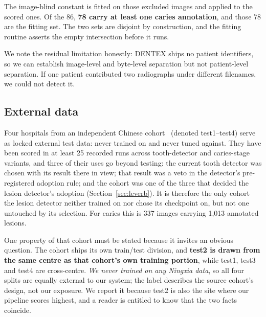 \documentclass[conference]{IEEEtran}
\begin{document}
The image-blind constant is fitted on those excluded images and applied to the
scored ones. Of the 86, \textbf{78 carry at least one caries annotation}, and
those 78 are the fitting set. The two sets are disjoint by construction, and the
fitting routine asserts the empty intersection before it runs.

We note the residual limitation honestly: DENTEX ships no patient identifiers,
so we can establish image-level and byte-level separation but not patient-level
separation. If one patient contributed two radiographs under different
filenames, we could not detect it.

\subsection{External data}
Four hospitals from an independent Chinese cohort~\cite{li2024multicenter} (denoted
test1--test4) serve as locked external test data: never trained on and never tuned
against. They have been scored in at least 25 recorded runs across tooth-detector and
caries-stage variants, and three of their uses go beyond testing: the current tooth
detector was chosen with its result there in view; that result was a veto in the
detector's pre-registered adoption rule; and the cohort was one of the three that
decided the lesion detector's adoption (Section~\ref{sec:leverb}). It is therefore
the only cohort the lesion detector neither trained on nor chose its checkpoint on,
but not one untouched by its selection. For caries this is 337 images carrying
1{,}013 annotated lesions.

One property of that cohort must be stated because it invites an obvious
question. The cohort ships its own train/test division, and \textbf{test2 is
drawn from the same centre as that cohort's own training portion}, while
test1, test3 and test4 are cross-centre. \emph{We never trained on any Ningxia
data}, so all four splits are equally external to our system; the label
describes the source cohort's design, not our exposure. We report it because
test2 is also the site where our pipeline scores highest, and a reader is
entitled to know that the two facts coincide.
\end{document}
